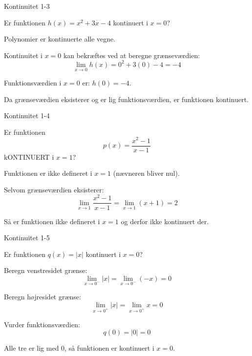 \documentclass{article}
\begin{document}
\newpage

\begin{exercise}{Kontinuitet 1-3}

Er funktionen $h(x) = x^2 + 3x - 4$ kontinuert i $x = 0$?


\hint

Polynomier er kontinuerte alle vegne.

\hint

Kontinuitet i $x = 0$ kan bekræftes ved at beregne grænseværdien:
\[
\lim_{x \to 0} h(x) = 0^2 + 3(0) - 4 = -4
\]

\hint

Funktionsværdien i $x = 0$ er: $h(0) = -4$.

\hint

Da grænseværdien eksisterer og er lig funktionsværdien, er funktionen kontinuert.

\end{exercise}

\newpage

\begin{exercise}{Kontinuitet 1-4}

Er funktionen
\[
 p(x) = \frac{x^2 - 1}{x - 1}
\]
kONTINUERT i $x = 1$?


\hint

Funktionen er ikke defineret i $x = 1$ (nævneren bliver nul).

\hint

Selvom grænseværdien eksisterer:
\[
\lim_{x \to 1} \frac{x^2 - 1}{x - 1} = \lim_{x \to 1} (x + 1) = 2
\]

\hint

Så er funktionen ikke defineret i $x = 1$ og derfor ikke kontinuert der.

\end{exercise}

\newpage

\begin{exercise}{Kontinuitet 1-5}

Er funktionen $q(x) = |x|$ kontinuert i $x = 0$?


\hint

Beregn venstresidet grænse:
\[
\lim_{x \to 0^-} |x| = \lim_{x \to 0^-} (-x) = 0
\]

\hint

Beregn højresidet grænse:
\[
\lim_{x \to 0^+} |x| = \lim_{x \to 0^+} x = 0
\]

\hint

Vurder funktionsværdien:
\[
q(0) = |0| = 0
\]

\hint

Alle tre er lig med 0, så funktionen er kontinuert i $x = 0$.

\end{exercise}
\end{document}
